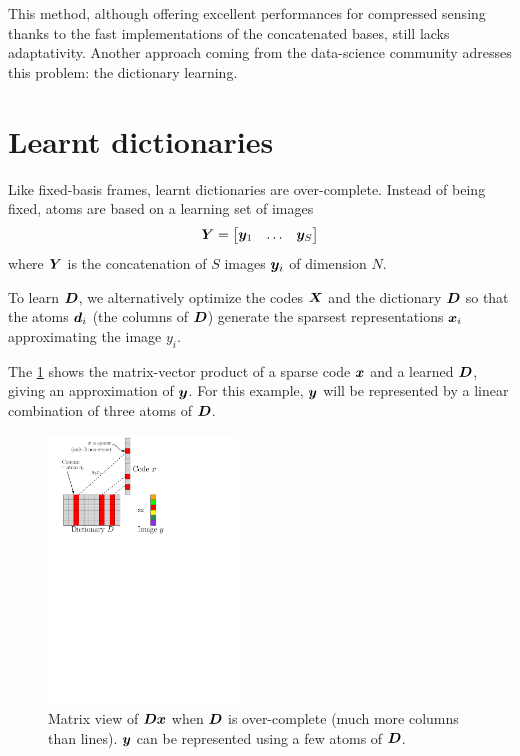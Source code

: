 This method, although offering excellent performances for compressed sensing thanks to the fast implementations of the concatenated bases, still lacks adaptativity. Another approach coming from the data-science community adresses this problem: the dictionary learning.

\section{Learnt dictionaries}

Like fixed-basis frames, learnt dictionaries are over-complete. Instead of being fixed, atoms are based on a learning set of images 
$$\bm Y = \begin{bmatrix} \bm y_1 & \dots & \bm y_S \end{bmatrix}$$
where $\bm Y$ is the concatenation of $S$ images $\bm y_i$ of dimension $N$.

To learn $\bm D$, we alternatively optimize the codes $\bm X$ and the dictionary $\bm D$ so that the atoms $\bm d_i$ (the columns of $\bm D$) generate the sparsest representations  $\bm x_i$ approximating the image $y_i$. %

The \cref{fig_overcomplete_matrix} shows the matrix-vector product of a sparse code $\bm x$ and a learned $\bm D$, giving an approximation of $\bm y$. For this example, $\bm y$ will be represented by a linear combination of three atoms of $\bm D$.


\begin{figure}[!ht] \centering
\includegraphics[width=0.45\textwidth]{figures/sparsity-matrix.pdf}
\caption{Matrix view of $\bm D\bm x$ when $\bm D$ is over-complete (much more columns than lines). $\bm y$ can be represented using a few atoms of $\bm D$.} \label{fig_overcomplete_matrix}
\end{figure}


